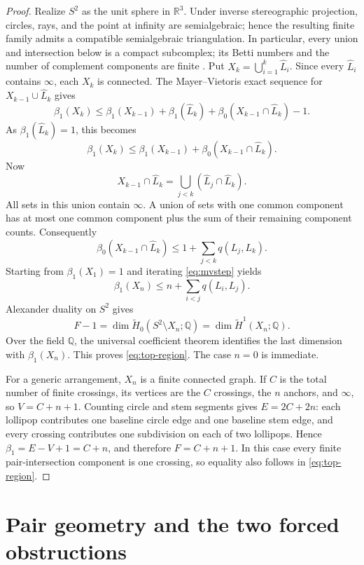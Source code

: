 \documentclass[11pt]{article}
\theoremstyle{plain}
\theoremstyle{definition}
\theoremstyle{remark}
\newcommand{\R}{\mathbb R}
\newcommand{\Q}{\mathbb Q}
\newcommand{\1}{\mathbf 1}
\newcommand{\betti}{\beta}
\begin{document}
\begin{proof}
Realize $S^2$ as the unit sphere in $\R^3$.  Under inverse stereographic
projection, circles, rays, and the point at infinity are semialgebraic; hence
the resulting finite family admits a compatible semialgebraic triangulation.
In particular, every union and intersection below is a compact subcomplex;
its Betti numbers and the number of complement components are finite
\cite{BCR}.  Put
$X_k=\bigcup_{i=1}^k\widehat L_i$.  Since every $\widehat L_i$ contains
$\infty$, each $X_k$ is connected.  The Mayer--Vietoris exact sequence for
$X_{k-1}\cup\widehat L_k$ gives
\[
 \betti_1(X_k)\leq \betti_1(X_{k-1})+\betti_1(\widehat L_k)
 +\betti_0(X_{k-1}\cap\widehat L_k)-1.
\]
As $\betti_1(\widehat L_k)=1$, this becomes
\begin{equation}\label{eq:mvstep}
 \betti_1(X_k)\leq \betti_1(X_{k-1})+
 \betti_0(X_{k-1}\cap\widehat L_k).
\end{equation}
Now
\[
 X_{k-1}\cap\widehat L_k
 =\bigcup_{j<k}(\widehat L_j\cap\widehat L_k).
\]
All sets in this union contain $\infty$.  A union of sets with one common
component has at most one common component plus the sum of their remaining
component counts.  Consequently
\[
 \betti_0(X_{k-1}\cap\widehat L_k)
 \leq1+\sum_{j<k}q(L_j,L_k).
\]
Starting from $\betti_1(X_1)=1$ and iterating \eqref{eq:mvstep} yields
\begin{equation}\label{eq:b1-bound}
 \betti_1(X_n)\leq n+\sum_{i<j}q(L_i,L_j).
\end{equation}
Alexander duality on $S^2$ \cite[Section~3.3]{Hatcher} gives
\[
 F-1=\dim \widetilde H_0(S^2\setminus X_n;\Q)
 =\dim \widetilde H^1(X_n;\Q).
\]
Over the field $\Q$, the universal coefficient theorem identifies the last
dimension with $\betti_1(X_n)$.  This proves \eqref{eq:top-region}.  The
case $n=0$ is immediate.

For a generic arrangement, $X_n$ is a finite connected graph.  If $C$ is the
total number of finite crossings, its vertices are the $C$ crossings, the $n$
anchors, and $\infty$, so $V=C+n+1$.  Counting circle and stem segments gives
$E=2C+2n$: each lollipop contributes one baseline circle edge and one baseline
stem edge, and every crossing contributes one subdivision on each of two
lollipops.  Hence
$\betti_1=E-V+1=C+n$, and therefore $F=C+n+1$.  In this case every finite
pair-intersection component is one crossing, so equality also follows in
\eqref{eq:top-region}.
\end{proof}

\section{Pair geometry and the two forced obstructions}\label{sec:geometry}
\end{document}
